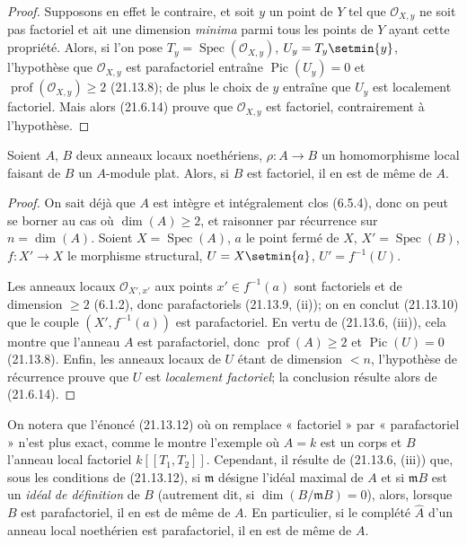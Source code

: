 \begin{proof}
Supposons en effet le contraire, et soit $y$ un point de $Y$ tel que
$\mathcal O_{X,y}$ ne soit pas factoriel et ait une dimension \emph{minima} parmi
tous les points de $Y$ ayant cette propriété. Alors, si l'on pose
$T_y=\operatorname{Spec}(\mathcal O_{X,y})$, $U_y=T_y\setmin\{y\}$, l'hypothèse que
$\mathcal O_{X,y}$ est parafactoriel entraîne $\operatorname{Pic}(U_y)=0$ et
$\operatorname{prof}(\mathcal O_{X,y})\geq2$ (21.13.8); de plus le choix de $y$
entraîne que $U_y$ est localement factoriel. Mais alors (21.6.14) prouve que
$\mathcal O_{X,y}$ est factoriel, contrairement à l'hypothèse.
\end{proof}

\begin{proposition}[21.13.12]
\label{IV.21.13.12}
Soient $A$, $B$ deux anneaux locaux noethériens,
$\rho:A\to B$ un homomorphisme local faisant de $B$ un $A$-module plat. Alors, si
$B$ est factoriel, il en est de même de $A$.
\end{proposition}

\begin{proof}
On sait déjà que $A$ est intègre et intégralement clos (6.5.4), donc on peut se borner
au cas où $\dim(A)\geq2$, et raisonner par récurrence sur $n=\dim(A)$. Soient
$X=\operatorname{Spec}(A)$, $a$ le point fermé de $X$,
$X'=\operatorname{Spec}(B)$, $f:X'\to X$ le morphisme structural,
$U=X\setmin\{a\}$, $U'=f^{-1}(U)$.

Les anneaux locaux $\mathcal O_{X',x'}$ aux points $x'\in f^{-1}(a)$ sont factoriels
et de dimension $\geq2$ (6.1.2), donc parafactoriels (21.13.9, (ii)); on en conclut
(21.13.10) que le couple $(X',f^{-1}(a))$ est parafactoriel. En vertu de (21.13.6,
(iii)), cela montre que l'anneau $A$ est parafactoriel, donc
$\operatorname{prof}(A)\geq2$ et $\operatorname{Pic}(U)=0$ (21.13.8). Enfin, les
anneaux locaux de $U$ étant de dimension $<n$, l'hypothèse de récurrence prouve que
$U$ est \emph{localement factoriel}; la conclusion résulte alors de (21.6.14).
\end{proof}

\begin{env}[21.13.12.1]
\label{IV.21.13.12.1}
On notera que l'énoncé (21.13.12) où on remplace « factoriel » par « parafactoriel »
n'est plus exact, comme le montre l'exemple où $A=k$ est un corps et $B$ l'anneau
local factoriel $k[[T_1,T_2]]$. Cependant, il résulte de (21.13.6, (iii)) que, sous
les conditions de (21.13.12), si $\mathfrak m$ désigne l'idéal maximal de $A$ et si
$\mathfrak mB$ est un \emph{idéal}
\emph{de définition} de $B$ (autrement dit, si $\dim(B/\mathfrak mB)=0$), alors,
lorsque $B$ est parafactoriel, il en est de même de $A$. En particulier, si le
complété $\widehat A$ d'un anneau local noethérien est parafactoriel, il en est de
même de $A$.
\end{env}


